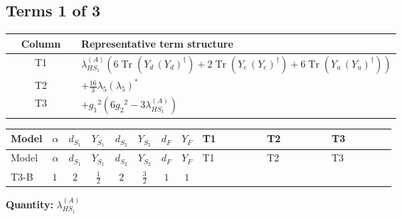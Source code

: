 \documentclass[8pt]{article}
\begin{document}
\begin{landscape}
\subsection*{Terms 1 of 3}
\begin{center}
\begin{tabular}{@{}c >{\raggedright\arraybackslash}p{0.82\linewidth}@{}}
\toprule
Column & Representative term structure \\
\midrule
T1 & \(\displaystyle {\lambda_{HS_1}^{(A)}} (6 \operatorname{Tr}\!\left({Y_d}\,\left({Y_d}\right)^{\dagger}\right)+2 \operatorname{Tr}\!\left({Y_e}\,\left({Y_e}\right)^{\dagger}\right)+6 \operatorname{Tr}\!\left({Y_u}\,\left({Y_u}\right)^{\dagger}\right))\) \\
\midrule
T2 & \(\displaystyle +\frac{16}{3} {\lambda_5} \left({\lambda_5}\right)^{*}\) \\
\midrule
T3 & \(\displaystyle +{g_1}^2 \left(6 {g_2}^2-3 {\lambda_{HS_1}^{(A)}}\right)\) \\
\midrule
\bottomrule
\end{tabular}
\end{center}
\smallskip
\tiny
\begin{longtable}{@{}llcccccc >{\raggedright\arraybackslash}p{0.21\linewidth} >{\raggedright\arraybackslash}p{0.21\linewidth} >{\raggedright\arraybackslash}p{0.21\linewidth}@{}}
\toprule
Model & $\alpha$ & $d_{S_1}$ & $Y_{S_1}$ & $d_{S_2}$ & $Y_{S_2}$ & $d_F$ & $Y_F$ & T1 & T2 & T3 \\
\midrule
\endfirsthead
\toprule
Model & $\alpha$ & $d_{S_1}$ & $Y_{S_1}$ & $d_{S_2}$ & $Y_{S_2}$ & $d_F$ & $Y_F$ & T1 & T2 & T3 \\
\midrule
\endhead
T3-B & $1$ & $2$ & $\frac{1}{2}$ & $2$ & $\frac{3}{2}$ & $1$ & $1$ & \scriptsize\adjustbox{max width=\linewidth}{$\begin{gathered} {\lambda_{HS_1}^{(A)}} (6 \operatorname{Tr}\!\left({Y_d}\,\left({Y_d}\right)^{\dagger}\right)+2 \operatorname{Tr}\!\left({Y_e}\,\left({Y_e}\right)^{\dagger}\right)+6 \operatorname{Tr}\!\left({Y_u}\,\left({Y_u}\right)^{\dagger}\right))\end{gathered}$} & \scriptsize\adjustbox{max width=\linewidth}{$\begin{gathered} +\frac{16}{3} {\lambda_5} \left({\lambda_5}\right)^{*}\end{gathered}$} & \scriptsize\adjustbox{max width=\linewidth}{$\begin{gathered} +{g_1}^2 \left(6 {g_2}^2-3 {\lambda_{HS_1}^{(A)}}\right)\end{gathered}$} \\
\midrule
\bottomrule
\end{longtable}
\clearpage
\noindent\textbf{Quantity: }$\lambda_{HS_1}^{(A)}$\par\smallskip

\end{landscape}
\end{document}
